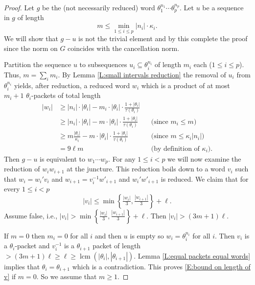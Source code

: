 \documentclass[10pt,a4paper]{amsart}
\newcommand{\OP}[1]{\operatorname{#1}}
\begin{document}
\begin{proof}
Let $g$ be the (not necessarily reduced) word $\theta_1^{n_1} \cdots \theta_p^{n_p}$.
Let $u$ be a sequence in $g$ of length 
\[
m \leq \min_{1 \leq i \leq p} |n_i| \cdot \kappa_i.
\] 
We will show that $g - u$ is not the trivial element and by this complete the proof since the norm on $G$ coincides with the cancellation norm.

Partition the sequence $u$ to subsequences $u_i \subseteq \theta_i^{n_i}$ of length $m_i$ each ($1 \leq i \leq p$).
Thus, $m=\sum_i m_i$.
By Lemma \ref{L:small intervals reduction} the removal of $u_i$ from $\theta_i^{n_i}$ yields, after reduction, a reduced word $w_i$ which is a product of at most $m_i+1$ $\theta_i$-packets of total length
\begin{align*}
|w_i| &\geq 
|n_i| \cdot |\theta_i| -m_i \cdot |\theta_i| \cdot \tfrac{1+|\theta_i|}{\tau(\theta_i)} 
\\
& \geq
|n_i| \cdot |\theta_i| - m \cdot |\theta_i| \cdot \tfrac{1+|\theta_i|}{\tau(\theta_i)} && \text{(since $m_i \leq m$)}
\\
& \geq
m \tfrac{|\theta_i|}{\kappa_i} - m \cdot |\theta_i| \cdot \tfrac{1+|\theta_i|}{\tau(\theta_i)} && \text{(since $m \leq \kappa_i |n_i|$)} \\
& =
9\ell m && \text{(by definition of $\kappa_i$)}.
\end{align*}
Then $g - u$ is equivalent to $w_1 \cdots w_p$. 
For any $1 \leq i <p$ we will now examine the reduction of $w_i w_{i+1}$ at the juncture.
This reduction boils down to a word $v_i$ such that $w_i=w_i'v_i$ and $w_{i+1}=v_i^{-1} w'_{i+1}$ and $w_i'w'_{i+1}$ is reduced.
We claim that for every $1 \leq i <p$
\begin{equation}\label{E:bound on length of v}
|v_i| \leq \min\left\{ \tfrac{|w_i|}{3},\tfrac{|w_{i+1}|}{3} \right\}+\ell.
\end{equation}
Assume false, i.e., $|v_i|>\min\left\{ \tfrac{|w_i|}{3},\tfrac{|w_{i+1}|}{3} \right\}+\ell$.
Then $|v_i|> (3m+1)\ell$.

If $m=0$ then $m_i=0$ for all $i$ and then $u$ is empty so $w_i=\theta_i^{n_i}$ for all $i$.
Then $v_i$ is a $\theta_i$-packet and $v_{i}^{-1}$ is a $\theta_{i+1}$ packet of length $>(3m+1)\ell \geq \ell \geq \OP{lcm}(|\theta_i|,|\theta_{i+1}|)$.
Lemma \ref{L:equal packets equal words}  implies that $\theta_i=\theta_{i+1}$ which is a contradiction.
This proves \eqref{E:bound on length of v} if $m=0$.
So we assume that $m\geq 1$.


\end{proof}
\end{document}
